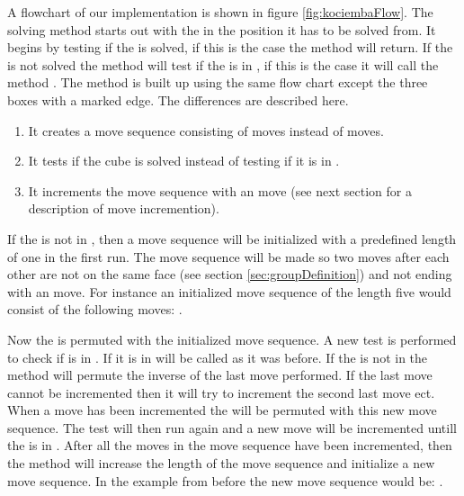 A flowchart of our implementation is shown in figure \ref{fig:kociembaFlow}.
The solving method starts out with the \rubik{} in the position it has to be solved from.
It begins by testing if the \rubik{} is solved, if this is the case the method will return.
If the \rubik{} is not solved the method will test if the \rubik{} is in , if this is the case it will call the method .
The method  is built up using the same flow chart except the three boxes with a marked edge.
The differences are described here.

\begin{enumerate}
	\item It creates a move sequence consisting of  moves instead of  moves.
	\item It tests if the cube is solved instead of testing if it is in .
	\item It increments the move sequence with an  move (see next section for a description of move incremention).
\end{enumerate} 

If the \rubik{} is not in , then a move sequence will be initialized with a predefined length of one in the first run.
The move sequence will be made so two moves after each other are not on the same face (see section \ref{sec:groupDefinition}) and not ending with an  move.
For instance an initialized move sequence of the length five would consist of the following moves: .

Now the \rubik{} is permuted with the initialized move sequence.
A new test is performed to check if \rubik{} is in .
If it is in   will be called as it was before.
If the \rubik{} is not in  the method will permute the inverse of the last move performed.
If the last move cannot be incremented then it will try to increment the second last move ect.
When a move has been incremented the \rubik{} will be permuted with this new move sequence.
The test will then run again and a new move will be incremented untill the \rubik{} is in .
After all the moves in the move sequence have been incremented, then the method will increase the length of the move sequence and initialize a new move sequence.
In the example from before the new move sequence would be: .



	
	
	
	
